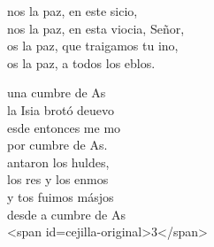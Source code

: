 \documentclass[12pt]{article}
\begin{document}
\begin{multicols*}{2}
\begin{cancion}%
	nos la paz, en este sicio,\\
	nos la paz, en esta viocia, Señor,\\
	os la paz, que traigamos tu ino,\\
	os la paz, a todos los eblos.\\
\end{cancion}%

\begin{cancion}%
	una cumbre de As  \\
	la Isia brotó deuevo\\
	esde entonces me mo\\
	por cumbre de As. \\
	antaron los huldes,\\
	los res y los enmos\\
	y tos fuimos másjos\\
	desde a cumbre de As\\
<span id=cejilla-original>3</span>\\
\end{cancion}%


\end{multicols*}
\end{document}
